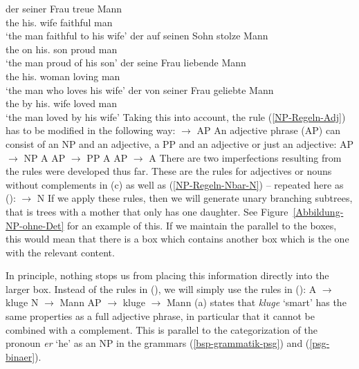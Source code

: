 \eal
\ex 
\gll der seiner Frau treue Mann\\
     the his.\DAT{} wife faithful man\\
\glt `the man faithful to his wife'
\ex 
\gll der auf seinen Sohn stolze Mann\\
     the on his.\ACC{} son proud man\\
\glt `the man proud of his son'
\ex 
\gll der seine Frau liebende Mann\\
     the his.\ACC{} woman loving man\\
\glt `the man who loves his wife'
\ex 
\gll der von seiner Frau geliebte Mann\\
     the by his.\DAT{} wife loved man\\
\glt `the man loved by his wife'	 
\zl
Taking this into account, the rule (\ref{NP-Regeln-Adj}) has to be modified in the following way:
\ea
\label{NP-Regeln-AP} 
\nbar $\to$ AP \nbar
\z
An adjective phrase (AP) can consist of an NP and an adjective, a PP and an adjective or just an adjective:
\eal
\ex AP $\to$ NP A
\ex AP $\to$ PP A
\ex AP $\to$ A
\zl
There are two imperfections resulting from the rules were developed thus far. These are the rules for adjectives
or nouns without complements in (c) as well as (\ref{NP-Regeln-Nbar-N}) -- repeated here as ():
\ea
\nbar $\to$ N
\z
If we apply these rules, then we will generate unary branching subtrees, that is trees with a mother that
only has one daughter. See Figure~\ref{Abbildung-NP-ohne-Det} for an example of this. If we maintain the
parallel to the boxes, this would mean that there is a box which contains another box which is the one with 
the relevant content.

In principle, nothing stops us from placing this information directly into the larger box. Instead of
the rules in (), we will simply use the rules in ():
\eal
\ex A $\to$ kluge
\ex N $\to$ Mann
\zl
\eal
\label{Lexikon-Projektion}
\ex AP $\to$ kluge
\ex \nbar $\to$ Mann
\zl
(a) states that \emph{kluge}  `smart' has the same properties as a full adjective phrase, in particular that it cannot be combined
with a complement. This is parallel to the categorization of the pronoun \emph{er} `he' as an NP in the grammars
(\ref{bsp-grammatik-psg}) and (\ref{psg-binaer}).

